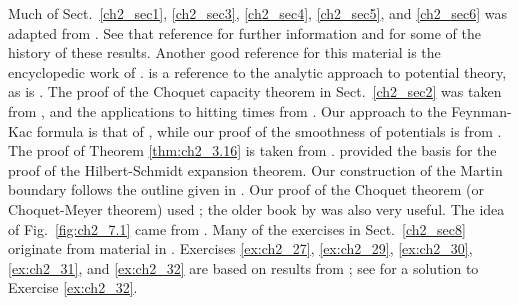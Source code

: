 Much of Sect.\ \ref{ch2_sec1}, \ref{ch2_sec3}, \ref{ch2_sec4}, \ref{ch2_sec5}, and \ref{ch2_sec6} was adapted from \cite{PortStone1978}. See that reference for further information and for some of the history of these results. Another good reference for this material is the encyclopedic work of \cite{Doob1984}. \cite{Helms1969} is a reference to the analytic approach to potential theory, as is \cite{Werner1981}. The proof of the Choquet capacity theorem in Sect.\ \ref{ch2_sec2} was taken from \cite{DellacherieMeyer1975}, and the applications to hitting times from \cite{BlumenthalGetoor1968}. Our approach to the Feynman-Kac formula is that of \cite{Williams1979}, while our proof of the smoothness of potentials is from \cite{GilbargTrudinger1983}. The proof of Theorem \ref{thm:ch2_3.16} is taken from \cite{BassKhoshnevisan1992}. \cite{Yosida1960} provided the basis for the proof of the Hilbert-Schmidt expansion theorem. Our construction of the Martin boundary follows the outline given in \cite{Brelot1969}. Our proof of the Choquet theorem (or Choquet-Meyer theorem) used \cite{DellacherieMeyer1983}; the older book by \cite{Meyer1966} was also very useful. The idea of Fig.\ \ref{fig:ch2_7.1} came from \cite{Phelps1966}. Many of the exercises in Sect.\ \ref{ch2_sec8} originate from material in \cite{PortStone1978}. Exercises \ref{ex:ch2_27}, \ref{ex:ch2_29}, \ref{ex:ch2_30}, \ref{ex:ch2_31}, and \ref{ex:ch2_32} are based on results from \cite{BlumenthalGetoor1968}; see \cite{BenvenisteJacod1973} for a solution to Exercise \ref{ex:ch2_32}.